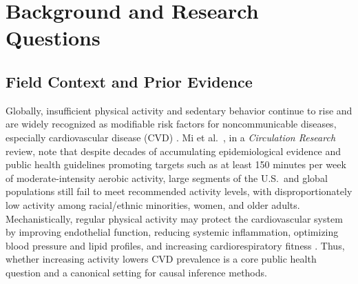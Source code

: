 \documentclass[12pt,a4paper]{article}
\begin{document}
\newpage
\setcounter{page}{1}

\section{Background and Research Questions}

\subsection{Field Context and Prior Evidence}

Globally, insufficient physical activity and sedentary behavior continue to rise and are widely recognized as modifiable risk factors for noncommunicable diseases, especially cardiovascular disease (CVD) \cite{mi2025creview}. Mi et al.\ \cite{mi2025creview}, in a \textit{Circulation Research} review, note that despite decades of accumulating epidemiological evidence and public health guidelines promoting targets such as at least 150 minutes per week of moderate-intensity aerobic activity, large segments of the U.S.\ and global populations still fail to meet recommended activity levels, with disproportionately low activity among racial/ethnic minorities, women, and older adults. Mechanistically, regular physical activity may protect the cardiovascular system by improving endothelial function, reducing systemic inflammation, optimizing blood pressure and lipid profiles, and increasing cardiorespiratory fitness \cite{mi2025creview}. Thus, whether increasing activity lowers CVD prevalence is a core public health question and a canonical setting for causal inference methods.
\end{document}
